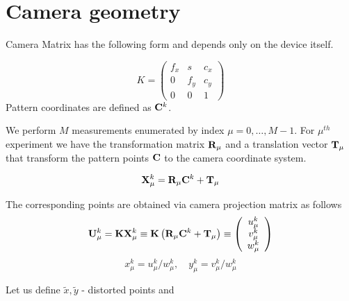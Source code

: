 \documentclass[a4paper,10pt]{article}
\title{}
\author{}
\begin{document}
\maketitle

\begin{abstract}

\end{abstract}

\section{Camera geometry}

Camera Matrix has the following form and depends only on the device itself.

\begin{equation}
 K=\left(\begin{array}{ccc}
          f_x & s & c_x \\
          0 & f_y & c_y \\
          0 & 0 & 1
         \end{array}
\right)
\end{equation}
Pattern coordinates are defined as ${\bf C}^k$.

We perform $M$ measurements enumerated by index $\mu = 0,\ldots, M-1$. For $\mu^{th}$ experiment we have the transformation matrix ${\bf R}_\mu$ and a translation vector ${\bf T}_\mu$ that transform the pattern points ${\bf C}$ to the camera coordinate system.

\begin{equation}
 {\bf X}^k_\mu = {\bf R}_\mu {\bf C}^k+ {\bf T}_\mu
\end{equation}

The corresponding points are obtained via camera projection matrix as follows
{
\begin{equation}
 {\bf U}^k_\mu = {\bf K} {\bf X}^{k}_\mu \equiv {\bf K} \left({\bf R}_\mu {\bf C}^k + {\bf T}_\mu\right) \equiv \left(\begin{array}{c}
  u^{k}_\mu \\ v^{k}_\mu \\ w^{k}_\mu
 \end{array}\right)\label{uproj}
\end{equation}
}
\begin{equation}
 x^{k}_\mu = u^{k}_\mu / w^{k}_\mu, \quad y^{k}_\mu = v^{k}_\mu / w^{k}_\mu
\end{equation}

Let us define $\tilde{x}, \tilde{y}$ - distorted points and
\end{document}
